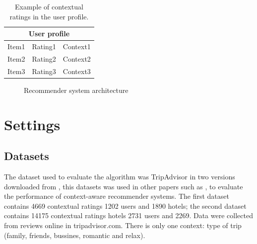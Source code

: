 \begin{table}[htb]
\centering
\caption{Example of contextual ratings in the user profile.}
\label{tab:2}
\begin{tabular}{lll}
\hline
\multicolumn{3}{c}{User profile} \\ \hline
Item1 & Rating1 & Context1 \\ 
Item2 & Rating2 & Context2 \\ 
Item3 & Rating3 & Context3 \\ \hline
\end{tabular}
\end{table}





\begin{figure}
\captionsetup{justification=centering,margin=2cm}
\centering

\caption{Recommender system architecture}
\label{fig:architecture}       %
\end{figure}



\section{Settings} \label{sec:4}

\subsection{Datasets}\label{sec:4.1}

The dataset used to evaluate the algorithm was TripAdvisor in two versions
downloaded from \cite{linkzeng}, this datasets was used in other papers such as
\cite{zheng2014context}, \cite{zheng2012differential} to evaluate the
performance of context-aware recommender systems. The first dataset contains
4669 contextual ratings 1202 users and 1890 hotels; the second dataset contains
14175 contextual ratings hotels 2731 users and 2269. Data were collected from
reviews online in tripadvisor.com. There is only one context: type of trip
(family, friends, bussines, romantic and relax).


